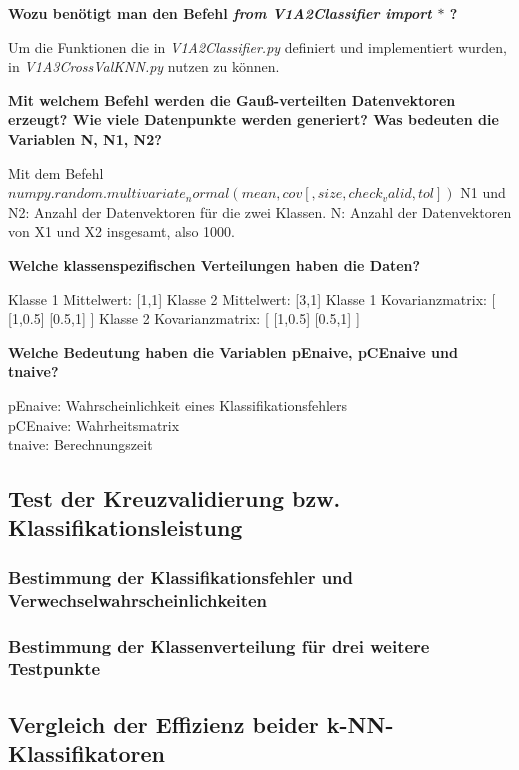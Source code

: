 \vspace{5px}
\noindent
\textbf{Wozu benötigt man den Befehl \textit{from V1A2\textunderscore Classifier import $\ast$ }?}

\vspace{5px}
\noindent
Um die Funktionen die in \textit{V1A2\textunderscore Classifier.py} definiert und implementiert wurden, in \textit{V1A3\textunderscore CrossVal\textunderscore KNN.py} nutzen zu können. 

\vspace{5px}
\noindent
\textbf{Mit welchem Befehl werden die Gauß-verteilten Datenvektoren erzeugt?
Wie viele Datenpunkte werden generiert? Was bedeuten die Variablen N, N1, N2?}

\vspace{5px}
\noindent
Mit dem Befehl
\textit{$numpy.random.multivariate_normal(mean, cov[, size, check_valid, tol])$}
N1 und N2: Anzahl der Datenvektoren für die zwei Klassen. 
N: Anzahl der Datenvektoren von X1 und X2 insgesamt, also 1000.

\vspace{5px}
\noindent
\textbf{Welche klassenspezifischen Verteilungen haben die Daten?}

\vspace{5px}
\noindent
Klasse 1 Mittelwert: [1,1]
Klasse 2 Mittelwert: [3,1]
Klasse 1 Kovarianzmatrix: [ [1,0.5] [0.5,1] ]
Klasse 2 Kovarianzmatrix: [ [1,0.5] [0.5,1] ]

\vspace{5px}
\noindent
\textbf{Welche Bedeutung haben die Variablen pE\textunderscore naive,
pCE\textunderscore naive und t\textunderscore naive?}

\vspace{5px}
\noindent
pE\textunderscore naive: Wahrscheinlichkeit eines Klassifikationsfehlers\\
pCE\textunderscore naive: Wahrheitsmatrix\\
t\textunderscore naive: Berechnungszeit\\

\subsection{Test der Kreuzvalidierung bzw. Klassifikationsleistung}

\subsubsection{Bestimmung der Klassifikationsfehler und Verwechselwahrscheinlichkeiten}

\subsubsection{Bestimmung der Klassenverteilung für drei weitere Testpunkte}

\subsection{Vergleich der Effizienz beider k-NN-Klassifikatoren}

